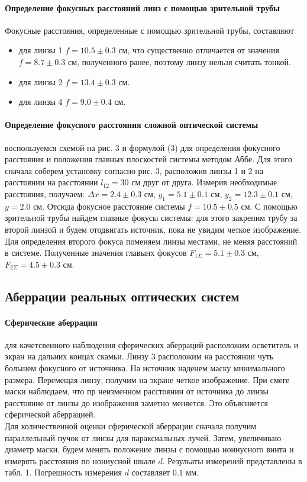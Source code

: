 \documentclass[a4paper,12pt]{article}
\theoremstyle{definition}
\begin{document}
\paragraph{Определение фокусных расстояний линз с помощью зрительной трубы}
Фокусные расстояния, определенные с помощью зрительной трубы, составляют
\begin{itemize}
    \item для линзы 1 $f = 10.5 \pm 0.3$ см, что существенно отличается от значения $f = 8.7 \pm 0.3$ см, полученного ранее, поэтому линзу нельзя считать тонкой.
    \item для линзы 2 $f = 13.4 \pm 0.3$ см.
    \item для линзы 4 $f = 9.0 \pm 0.4$ см.
\end{itemize}

\paragraph{Определение фокусного расстояния сложной оптической системы} воспользуемся схемой на рис. 3 и формулой (3) для определения фокусного расстояния и положения главных плоскостей системы методом Аббе. Для этого сначала соберем установку согласно рис. 3, расположив линзы 1 и 2 на расстоянии  на расстоянии $l_{12} = 30$ см друг от друга. Измерив необходимые расстояния, получаем: $\Delta x = 2.4 \pm 0.3$ см, $y_1 = 5.1 \pm 0.1$ см, $y_2 = 12.3 \pm 0.1$ см, $y = 2.0$ см. Отсюда фокусное расстояние системы $f = 10.5 \pm 0.5$ см. С помощью зрительной трубы найдем главные фокусы системы: для этого закрепим трубу за второй линзой и будем отодвигать источник, пока не увидим четкое изображение. Для определения второго фокуса поменяем линзы местами, не меняя расстояний в системе. Полученные значения главынх фокусов $F_{1\Sigma} = 5.1 \pm 0.3$ см, $F_{2\Sigma} = 4.5 \pm 0.3$ см.

\subsection*{Аберрации реальных оптических систем}
\paragraph{Сферические аберрации} для качетсвенного наблюдения сферических аберраций расположим осветитель и экран на дальних концах скамьи. Линзу 3 расположим на расстоянии чуть большем фокусного от источника. На источник наденем маску минимального размера. Перемещая линзу, получим на экране четкое изображение. При смеге маски наблюдаем, что пр неизменном расстоянии от источника до линзы расстояние от линзы до изображения заметно меняется. Это объясняется сферической аберрацией. \\
Для количественной оценки сферической аберрации сначала получим параллельный пучок от линзы для параксиальных лучей. Затем, увеличиваю диаметр маски, будем менять положение линзы с помощью нониусного винта и измерять расстояния по нониусной шкале $d$. Резульаты измерений представлены в табл. 1. Погрешность измерения $d$ составляет $0.1$ мм.
\end{document}
